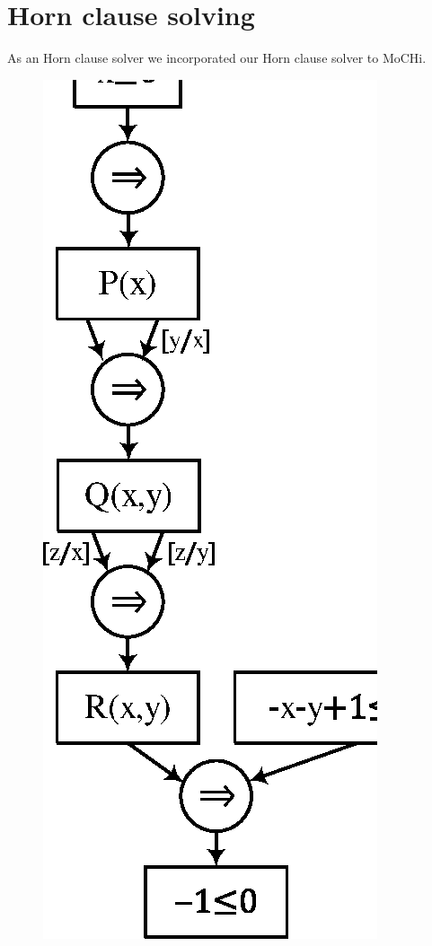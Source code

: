 \section{Horn clause solving}

As an Horn clause solver we incorporated our Horn clause solver to MoCHi.

\begin{figure}
\begin{center}
\includegraphics[scale=.6]{figures/unsat2.eps}

\end{center}
\end{figure}
